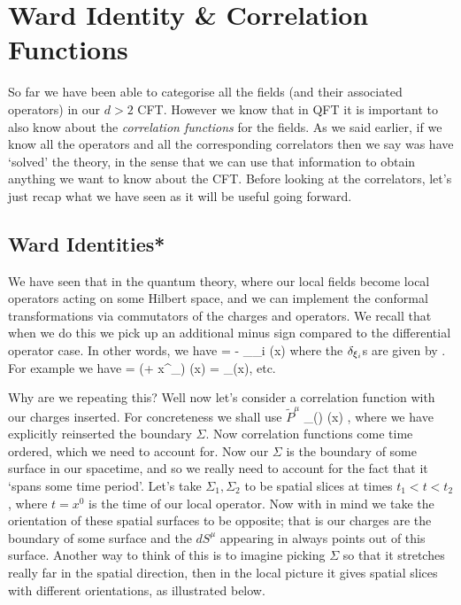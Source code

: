 \chapter{Ward Identity \& Correlation Functions}


So far we have been able to categorise all the fields (and their associated operators) in our $d>2$ CFT. However we know that in QFT it is important to also know about the \textit{correlation functions} for the fields. As we said earlier, if we know all the operators and all the corresponding correlators then we say was have `solved' the theory, in the sense that we can use that information to obtain anything we want to know about the CFT. Before looking at the correlators, let's just recap what we have seen as it will be useful going forward.

\section{Ward Identities*}

We have seen that in the quantum theory, where our local fields become local operators acting on some Hilbert space, and we can implement the conformal transformations via commutators of the charges and operators. We recall that when we do this we pick up an additional minus sign compared to the differential operator case. In other words, we have
\bse 
    [Q_{\xi_i},\cO(x)] = - \del_{\xi_i} \cO(x)
\ese 
where the $\delta_{\xi_i}$s are given by . For example we have 
\bse 
    [\widetilde{D},\cO(x)] = (\Delta + x^{\mu}\p_{\mu}) \cO(x) \qand [\widetilde{P}_{\mu}, \cO(x)] = \p_{\mu}\cO(x),
\ese 
etc. 

Why are we repeating this? Well now let's consider a correlation function with our charges inserted. For concreteness we shall use $\widetilde{P}^{\mu}$
\bse 
    \la {}_{\mu}(\Sigma) \cO(x) \ra, 
\ese 
where we have explicitly reinserted the boundary $\Sigma$. Now correlation functions come time ordered, which we need to account for. Now our $\Sigma$ is the boundary of some surface in our spacetime, and so we really need to account for the fact that it `spans some time period'. Let's take $\Sigma_1, \Sigma_2$ to be spatial slices at times $t_1 < t < t_2$, where $t=x^0$ is the time of our local operator. Now with  in mind we take the orientation of these spatial surfaces to be opposite; that is our charges are the boundary of some surface and the $dS^{\mu}$ appearing in  always points out of this surface. Another way to think of this is to imagine picking $\Sigma$ so that it stretches really far in the spatial direction, then in the local picture it gives spatial slices with different orientations, as illustrated below. 

